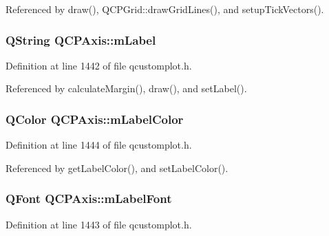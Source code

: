 Referenced by draw(), Q\+C\+P\+Grid\+::draw\+Grid\+Lines(), and setup\+Tick\+Vectors().

\hypertarget{class_q_c_p_axis_ae8001dbdfc47685c1cf7b98b044460e6}{}
\subsubsection[{m\+Label}]{\setlength{\rightskip}{0pt plus 5cm}Q\+String Q\+C\+P\+Axis\+::m\+Label\hspace{0.3cm}{\ttfamily [protected]}}\label{class_q_c_p_axis_ae8001dbdfc47685c1cf7b98b044460e6}


Definition at line 1442 of file qcustomplot.\+h.



Referenced by calculate\+Margin(), draw(), and set\+Label().

\hypertarget{class_q_c_p_axis_a457a003bb1c2b6ab73e5a173ba7558fd}{}
\subsubsection[{m\+Label\+Color}]{\setlength{\rightskip}{0pt plus 5cm}Q\+Color Q\+C\+P\+Axis\+::m\+Label\+Color\hspace{0.3cm}{\ttfamily [protected]}}\label{class_q_c_p_axis_a457a003bb1c2b6ab73e5a173ba7558fd}


Definition at line 1444 of file qcustomplot.\+h.



Referenced by get\+Label\+Color(), and set\+Label\+Color().

\hypertarget{class_q_c_p_axis_a37442d470e30e19b81ecaf979a34d046}{}
\subsubsection[{m\+Label\+Font}]{\setlength{\rightskip}{0pt plus 5cm}Q\+Font Q\+C\+P\+Axis\+::m\+Label\+Font\hspace{0.3cm}{\ttfamily [protected]}}\label{class_q_c_p_axis_a37442d470e30e19b81ecaf979a34d046}


Definition at line 1443 of file qcustomplot.\+h.



